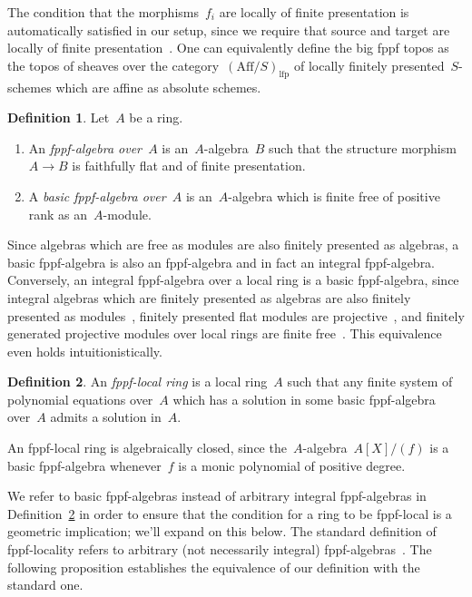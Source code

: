 \documentclass[10pt,reqno,a4paper]{amsbook}
\theoremstyle{definition}
\newtheorem{defn}{Definition}[section]
\theoremstyle{plain}
\theoremstyle{remark}
\newcommand{\Aff}{\mathrm{Aff}}
\newcommand{\lfp}{\mathrm{lfp}}
\newcommand{\?}{\,{:}\,}
\renewcommand{\_}{\mathpunct{.}\,}
\newcommand{\stacksproject}[1]{\cite[{\href{https://stacks.math.columbia.edu/tag/#1}{Tag~#1}}]{stacks-project}}
\begin{document}
The condition that the morphisms~$f_i$ are locally of finite presentation is
automatically satisfied in our setup, since we require that source and target
are locally of finite presentation~\stacksproject{02FV}. One can equivalently
define the big fppf topos as the topos of sheaves over the
category~$(\Aff/S)_\lfp$ of locally finitely presented~$S$-schemes which are
affine as absolute schemes.

\begin{defn}Let~$A$ be a ring.
\begin{enumerate}
\item An \emph{fppf-algebra over~$A$} is an~$A$-algebra~$B$ such that the
structure morphism~$A \to B$ is faithfully flat and of finite presentation.
\item A \emph{basic fppf-algebra over~$A$} is an~$A$-algebra which
is finite free of positive rank as an~$A$-module.
\end{enumerate}
\end{defn}

Since algebras which are free as modules are also finitely presented as
algebras, a basic fppf-algebra is also an fppf-algebra and in fact an integral
fppf-algebra. Conversely, an integral fppf-algebra over a local ring is a basic
fppf-algebra, since integral algebras which are finitely presented as algebras
are also finitely presented as modules~\stacksproject{0564}, finitely presented
flat modules are projective~\stacksproject{058R}, and finitely generated
projective modules over local rings are finite free~\stacksproject{00NX}. This
equivalence even holds intuitionistically.

\begin{defn}\label{defn:fppf-local-ring}
An \emph{fppf-local ring} is a local ring~$A$ such that any finite system of
polynomial equations over~$A$ which has a solution in some basic fppf-algebra
over~$A$ admits a solution in~$A$.
\end{defn}

An fppf-local ring is algebraically closed, since
the~$A$-algebra~$A[X]/(f)$ is a basic fppf-algebra whenever~$f$ is a monic polynomial
of positive degree.

We refer to basic fppf-algebras instead of arbitrary integral fppf-algebras in
Definition~\ref{defn:fppf-local-ring} in order to ensure that the condition for
a ring to be fppf-local is a geometric implication; we'll expand on this below.
The standard definition of fppf-locality refers to arbitrary (not necessarily
integral) fppf-algebras~\cite[Definition~4.1]{schroer:points-fppf}. The
following proposition establishes the equivalence of our definition with the
standard one.
\end{document}
